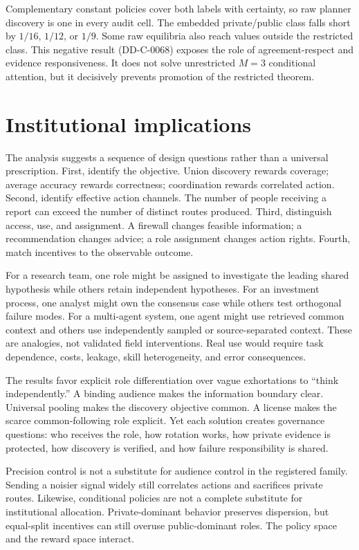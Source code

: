 \documentclass[11pt]{article}
\begin{document}
Complementary constant policies cover both labels with certainty, so raw
planner discovery is one in every audit cell. The embedded private/public class
falls short by $1/16$, $1/12$, or $1/9$. Some raw equilibria also reach values
outside the restricted class. This negative result (DD-C-0068) exposes the role
of agreement-respect and evidence responsiveness. It does not solve unrestricted
$M=3$ conditional attention, but it decisively prevents promotion of the
restricted theorem.

\section{Institutional implications}

The analysis suggests a sequence of design questions rather than a universal
prescription. First, identify the objective. Union discovery rewards coverage;
average accuracy rewards correctness; coordination rewards correlated action.
Second, identify effective action channels. The number of people receiving a
report can exceed the number of distinct routes produced. Third, distinguish
access, use, and assignment. A firewall changes feasible information; a
recommendation changes advice; a role assignment changes action rights. Fourth,
match incentives to the observable outcome.

For a research team, one role might be assigned to investigate the leading
shared hypothesis while others retain independent hypotheses. For an investment
process, one analyst might own the consensus case while others test orthogonal
failure modes. For a multi-agent system, one agent might use retrieved common
context and others use independently sampled or source-separated context. These
are analogies, not validated field interventions. Real use would require task
dependence, costs, leakage, skill heterogeneity, and error consequences.

The results favor explicit role differentiation over vague exhortations to
``think independently.'' A binding audience makes the information boundary
clear. Universal pooling makes the discovery objective common. A license makes
the scarce common-following role explicit. Yet each solution creates governance
questions: who receives the role, how rotation works, how private evidence is
protected, how discovery is verified, and how failure responsibility is shared.

Precision control is not a substitute for audience control in the registered
family. Sending a noisier signal widely still correlates actions and sacrifices
private routes. Likewise, conditional policies are not a complete substitute
for institutional allocation. Private-dominant behavior preserves dispersion,
but equal-split incentives can still overuse public-dominant roles. The policy
space and the reward space interact.
\end{document}
